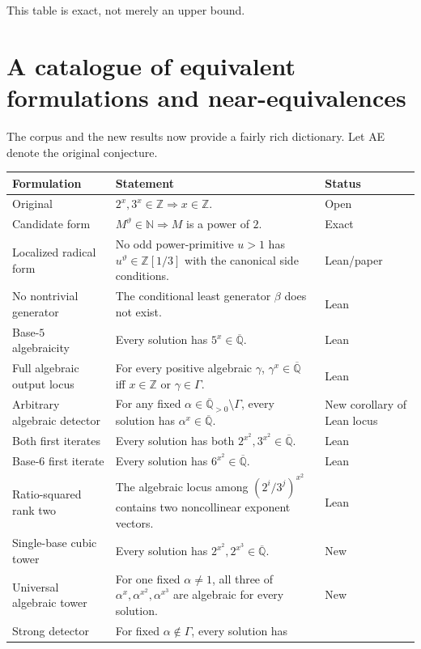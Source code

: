 \documentclass[11pt,oneside]{article}
\theoremstyle{definition}
\theoremstyle{remark}
\newcommand{\N}{\mathbb N}
\newcommand{\Z}{\mathbb Z}
\newcommand{\Qbar}{\overline{\mathbb Q}}
\newcommand{\Apos}{\overline{\mathbb Q}_{>0}}
\begin{document}
This table is exact, not merely an upper bound.

\section{A catalogue of equivalent formulations and near-equivalences}

The corpus and the new results now provide a fairly rich dictionary.  Let \textsf{AE} denote
the original conjecture.

\begin{longtable}{@{}>{\raggedright\arraybackslash}p{}>{\raggedright\arraybackslash}p{}>{\raggedright\arraybackslash}p{}@{}}
\toprule
Formulation & Statement & Status \\
\midrule
\endhead
Original & $2^x,3^x\in\Z\Rightarrow x\in\Z$. & Open \\
Candidate form & $M^{\vartheta}\in\N\Rightarrow M$ is a power of $2$. & Exact \\
Localized radical form & No odd power-primitive $u>1$ has
$u^{\vartheta}\in\Z[1/3]$ with the canonical side conditions. & Lean/paper \\
No nontrivial generator & The conditional least generator $\beta$ does not exist. & Lean \\
Base-$5$ algebraicity & Every solution has $5^x\in\Qbar$. & Lean \\
Full algebraic output locus & For every positive algebraic $\gamma$,
$\gamma^x\in\Qbar$ iff $x\in\Z$ or $\gamma\in\Gamma$. & Lean \\
Arbitrary algebraic detector & For any fixed $\alpha\in\Apos\setminus\Gamma$, every solution
has $\alpha^x\in\Qbar$. & New corollary of Lean locus \\
Both first iterates & Every solution has both $2^{x^2},3^{x^2}\in\Qbar$. & Lean \\
Base-$6$ first iterate & Every solution has $6^{x^2}\in\Qbar$. & Lean \\
Ratio-squared rank two & The algebraic locus among $(2^i/3^j)^{x^2}$ contains two
noncollinear exponent vectors. & Lean \\
Single-base cubic tower & Every solution has $2^{x^2},2^{x^3}\in\Qbar$. & New \\
Universal algebraic tower & For one fixed $\alpha\ne1$, all three of
$\alpha^x,\alpha^{x^2},\alpha^{x^3}$ are algebraic for every solution. & New \\
Strong detector & For fixed $\alpha\notin\Gamma$, every solution has

\end{longtable}
\end{document}
